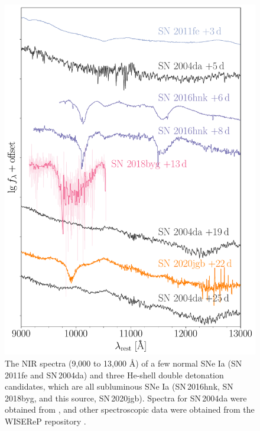 \documentclass[twocolumn]{aastex631}
\newcommand\sn{SN\,2020jgb}
\begin{document}
\begin{figure}
    \centering
    \includegraphics[width=\linewidth]{NIR_spec_comp.pdf}
    \caption{The NIR spectra (9,000 to 13,000 \AA) of a few normal SNe Ia (SN\,2011fe and SN\,2004da) and three He-shell double detonation candidates, which are all subluminous SNe Ia (SN\,2016hnk, SN\,2018byg, and this source, \sn). Spectra for SN\,2004da were obtained from \citet{Marion2009_NIR}, and other spectroscopic data were obtained from the WISEReP repository \citep{wiserep_2012}.}
    \label{fig:NIR_comp}
\end{figure}
\end{document}
